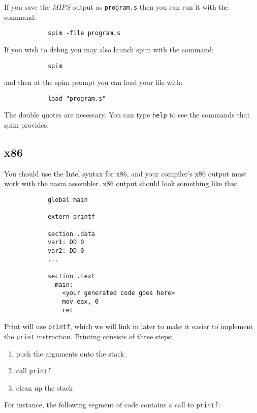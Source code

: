 \documentclass{article}
\newcommand{\code}[1]{\texttt{\textmd{#1}}}
\begin{document}
		If you save the \textit{MIPS} output as \code{program.s} then you can run it with the command:

		\begin{lstlisting}
			spim -file program.s
		\end{lstlisting}

		If you wish to debug you may also launch spim with the command:

		\begin{lstlisting}
			spim
		\end{lstlisting}

		and then at the spim prompt you can load your file with:

		\begin{lstlisting}
			load "program.s"
		\end{lstlisting}

		The double quotes are necessary. You can type \texttt{help} to see the commands that spim provides.


	\subsection{x86}

		You should use the Intel syntax for x86, and your compiler's x86 output must work with the nasm assembler.
		x86 output should look something like this:

		\begin{lstlisting}
			global main

			extern printf

			section .data
			var1: DD 0
			var2: DD 0
			...

			section .text
			  main:
			    <your generated code goes here>
			    mov eax, 0
			    ret
		\end{lstlisting}

		Print will use \code{printf}, which we will link in later to make it easier to implement the \code{print}
		instruction. Printing consists of three steps:

		\begin{enumerate}
			\item push the arguments onto the stack
			\item call \code{printf}
			\item clean up the stack
		\end{enumerate}

		For instance, the following segment of code contains a call to \code{printf}:
\end{document}
